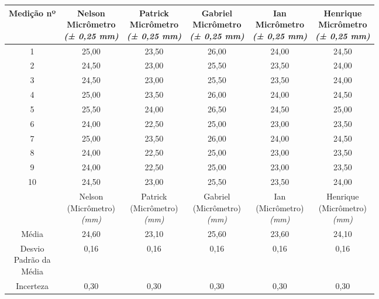 \documentclass{article}
\begin{document}
\begin{table}[h!]
\centering
\begin{tabular}{c c c c c c }
\toprule
Medição nº & \shortstack{Nelson\\Micrômetro\\\textit{(± 0,25 mm)}} & \shortstack{Patrick\\Micrômetro\\\textit{(± 0,25 mm)}} & \shortstack{Gabriel\\Micrômetro\\\textit{(± 0,25 mm)}} & \shortstack{Ian\\Micrômetro\\\textit{(± 0,25 mm)}} & \shortstack{Henrique\\Micrômetro\\\textit{(± 0,25 mm)}}\\
\midrule
1 & 25,00 & 23,50 & 26,00 & 24,00 & 24,50\\
2 & 24,50 & 23,00 & 25,50 & 23,50 & 24,00\\
3 & 24,50 & 23,00 & 25,50 & 23,50 & 24,00\\
4 & 25,00 & 23,50 & 26,00 & 24,00 & 24,50\\
5 & 25,50 & 24,00 & 26,50 & 24,50 & 25,00\\
6 & 24,00 & 22,50 & 25,00 & 23,00 & 23,50\\
7 & 25,00 & 23,50 & 26,00 & 24,00 & 24,50\\
8 & 24,00 & 22,50 & 25,00 & 23,00 & 23,50\\
9 & 24,00 & 22,50 & 25,00 & 23,00 & 23,50\\
10 & 24,50 & 23,00 & 25,50 & 23,50 & 24,00\\
\midrule
&\shortstack{Nelson\\(Micrômetro)\\\textit{(mm)}} & \shortstack{Patrick\\(Micrômetro)\\\textit{(mm)}} & \shortstack{Gabriel\\(Micrômetro)\\\textit{(mm)}} & \shortstack{Ian\\(Micrômetro)\\\textit{(mm)}} & \shortstack{Henrique\\(Micrômetro)\\\textit{(mm)}}\\
\midrule
Média & 24,60 & 23,10 & 25,60 & 23,60 & 24,10\\[3pt]
\shortstack{Desvio\\Padrão da\\Média} & 0,16 & 0,16 & 0,16 & 0,16 & 0,16\\[3pt]
Incerteza & 0,30 & 0,30 & 0,30 & 0,30 & 0,30\\
\bottomrule
\end{tabular}
\end{table}
\end{document}
